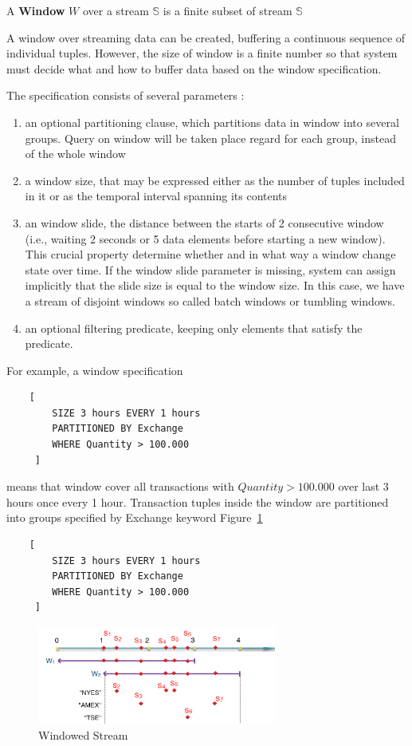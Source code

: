 \begin{defi}
A \textbf{Window} $W$ over a stream $\mathbb{S}$ is a finite subset of stream $\mathbb{S}$ \cite{Dindar:2013}
\end{defi}


A window over streaming data can be created, buffering a continuous sequence of individual tuples. However, the size of window is a finite number so that system must decide what and how to buffer data based on the window specification. 

The specification consists of several parameters :
\begin{enumerate}
\item an optional partitioning clause, which partitions data in window into several groups. Query on window will be taken place regard for each group, instead of the whole window
\item a window size, that may be expressed either as the number of tuples included in it or as the temporal interval spanning its contents
\item an window slide, the distance between the starts of 2 consecutive window (i.e., waiting 2 seconds or 5 data elements before starting a new window). This crucial property determine whether and in what way a window change state over time. If the window slide parameter is missing, system can  assign implicitly that the slide size is equal to the window size. In this case, we have a stream of disjoint windows so called batch windows or tumbling windows.
\item an optional filtering predicate, keeping only elements that satisfy the predicate.
\end{enumerate}

For example, a window specification 
\begin{lstlisting}
	[
		SIZE 3 hours EVERY 1 hours 
	 	PARTITIONED BY Exchange
	 	WHERE Quantity > 100.000
	 ]
\end{lstlisting}
means that window cover all transactions with $Quantity > 100.000$ over last 3 hours once every 1 hour. Transaction tuples inside the window are partitioned into groups specified by Exchange keyword Figure~\ref{fig:winSpec}
\begin{lstlisting}
	[
		SIZE 3 hours EVERY 1 hours 
	 	PARTITIONED BY Exchange
	 	WHERE Quantity > 100.000
	 ]
\end{lstlisting}

\begin{figure}[htbp!] 
\centering    
\includegraphics[width=0.7\textwidth]{winSpec}
\caption{Windowed Stream}
\label{fig:winSpec}
\end{figure}

